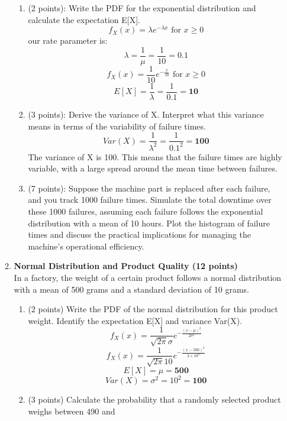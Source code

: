 \documentclass[a3paper,12pt]{article} %
\begin{document}
\begin{enumerate}
\begin{enumerate}
        \begin{enumerate}
            \item (2 points): Write the PDF for the exponential distribution and calculate the expectation E[X].
            \[
                f_X(x) = \lambda e^{-\lambda x} \text{ for } x \geq 0
            \]
            our rate parameter is:
            \[
                \lambda = \frac{1}{\mu} = \frac{1}{10} = 0.1
            \]
            \[
                f_X(x) = \frac{1}{10} e^{-\frac{x}{10}} \text{ for } x \geq 0   
            \]
            \[
                E[X] = \frac{1}{\lambda} = \frac{1}{0.1} = \textbf{10}
            \]
            \item (3 points): Derive the variance of X. Interpret what this variance means in terms of the variability  of failure times.
            \[
                Var(X) = \frac{1}{\lambda^2} = \frac{1}{0.1^2} = \textbf{100}
            \]
            The variance of X is 100. This means that the failure times are highly variable, with a large spread around the mean time between failures.
            \item (7 points): Suppose the machine part is replaced after each failure, and you track 1000 failure
            times. Simulate the total downtime over these 1000 failures, assuming each failure follows the
            exponential distribution with a mean of 10 hours. Plot the histogram of failure times and discuss
            the practical implications for managing the machine’s operational efficiency.
        \end{enumerate}
        \item \textbf{Normal Distribution and Product Quality (12 points)}
        \\ In a factory, the weight of a certain product follows a normal distribution with a mean of 500 grams
        and a standard deviation of 10 grams.
        \begin{enumerate}
            \item (2 points) Write the PDF of the normal distribution for this product weight. Identify the expectation E[X] and variance Var(X).
            \[
                f_X(x) = \frac{1}{\sqrt{2\pi}\sigma} e^{-\frac{(x - \mu)^2}{2\sigma^2}}
            \]
            \[
                f_X(x) = \frac{1}{\sqrt{2\pi}10} e^{-\frac{(x - 500)^2}{2 \times 10^2}}
            \]
            \[
                E[X] = \mu = \textbf{500}
            \]
            \[
                Var(X) = \sigma^2 = 10^2 = \textbf{100}
            \]
            \item (3 points) Calculate the probability that a randomly selected product weighs between 490 and

\end{enumerate}
\end{enumerate}
\end{enumerate}
\end{document}
